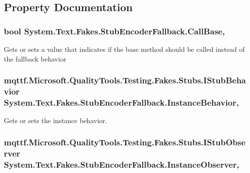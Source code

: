 \subsection{Property Documentation}
\hypertarget{class_system_1_1_text_1_1_fakes_1_1_stub_encoder_fallback_a5de09a35903f5a0aba25f3685a4894a0}{
\subsubsection[{Call\-Base}]{\setlength{\rightskip}{0pt plus 5cm}bool System.\-Text.\-Fakes.\-Stub\-Encoder\-Fallback.\-Call\-Base\hspace{0.3cm}{\ttfamily [get]}, {\ttfamily [set]}}}\label{class_system_1_1_text_1_1_fakes_1_1_stub_encoder_fallback_a5de09a35903f5a0aba25f3685a4894a0}


Gets or sets a value that indicates if the base method should be called instead of the fallback behavior

\hypertarget{class_system_1_1_text_1_1_fakes_1_1_stub_encoder_fallback_ab57b23ea4fa628c6e493ecb934b046ef}{
\subsubsection[{Instance\-Behavior}]{\setlength{\rightskip}{0pt plus 5cm}mqttf.\-Microsoft.\-Quality\-Tools.\-Testing.\-Fakes.\-Stubs.\-I\-Stub\-Behavior System.\-Text.\-Fakes.\-Stub\-Encoder\-Fallback.\-Instance\-Behavior\hspace{0.3cm}{\ttfamily [get]}, {\ttfamily [set]}}}\label{class_system_1_1_text_1_1_fakes_1_1_stub_encoder_fallback_ab57b23ea4fa628c6e493ecb934b046ef}


Gets or sets the instance behavior.

\hypertarget{class_system_1_1_text_1_1_fakes_1_1_stub_encoder_fallback_a585e29a44f64d210a25f11dc56cd07f7}{
\subsubsection[{Instance\-Observer}]{\setlength{\rightskip}{0pt plus 5cm}mqttf.\-Microsoft.\-Quality\-Tools.\-Testing.\-Fakes.\-Stubs.\-I\-Stub\-Observer System.\-Text.\-Fakes.\-Stub\-Encoder\-Fallback.\-Instance\-Observer\hspace{0.3cm}{\ttfamily [get]}, {\ttfamily [set]}}}\label{class_system_1_1_text_1_1_fakes_1_1_stub_encoder_fallback_a585e29a44f64d210a25f11dc56cd07f7}


